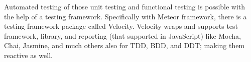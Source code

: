 Automated testing of those unit testing and functional testing is possible with the help of a testing framework.
Specifically with Meteor framework, there is a testing framework package called Velocity.
Velocity wraps and supports test framework, library, and reporting (that supported in JavaScript) like Mocha, Chai, Jasmine, and much others also for \ac{TDD}, \ac{BDD}, and \ac{DDT}; making them reactive as well.
